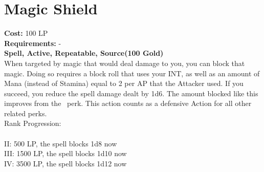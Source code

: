 \section{Magic Shield}\label{spell:magicShield}
\textbf{Cost:} 100 LP\\
\textbf{Requirements:} -\\
\textbf{Spell, Active, Repeatable, Source(100 Gold)}\\
When targeted by magic that would deal damage to you, you can block that magic.
Doing so requires a block roll that uses your INT, as well as an amount of Mana (instead of Stamina) equal to 2 per AP that the Attacker used.
If you succeed, you reduce the spell damage dealt by 1d6.
The amount blocked like this improves from the~ perk.
This action counts as a defensive Action for all other related perks.
\\
Rank Progression:\\
\\
II: 500 LP, the spell blocks 1d8 now\\
III: 1500 LP, the spell blocks 1d10 now\\
IV: 3500 LP, the spell blocks 1d12 now\\